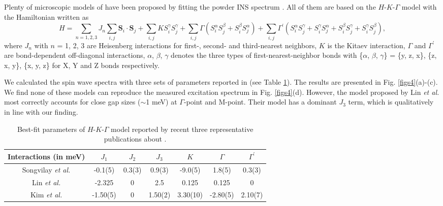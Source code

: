 \documentclass[%
reprint,
superscriptaddress,
amsmath,amssymb,
aps,
prb,
]{revtex4-2}
\begin{document}
	Plenty of microscopic models of  have been proposed by fitting the powder INS spectrum \cite{SongvilayPRB2020,LinNC2021,SamarakoonPRB2021,KimJPCM2021,SandersArxiv2021}. All of them are based on the $H$-$K$-$\Gamma$ model with the Hamiltonian written as
	\begin{equation}
		H = \sum_{n = 1,2,3}J_n\sum_{i,j}\textbf{S}_i\cdot\textbf{S}_j+\sum_{i,j}KS_i^{\gamma}S_j^{\gamma}+\sum_{i,j}\Gamma(S_i^{\alpha}S_j^{\beta}+S_i^{\beta}S_j^{\alpha})+\sum_{i,j}\Gamma^{\prime}(S_i^{\alpha}S_j^{\gamma}+S_i^{\gamma}S_j^{\alpha}+S_i^{\beta}S_j^{\gamma}+S_i^{\gamma}S_j^{\beta}),
	\end{equation}
	where $J_n$ with $n$ = 1, 2, 3 are Heisenberg interactions for first-, second- and third-nearest neighbors, $K$ is the Kitaev interaction, $\Gamma$ and $\Gamma^{\prime}$ are bond-dependent off-diagonal interactions, $\alpha$, $\beta$, $\gamma$ denotes the three types of first-nearest-neighbor bonds with \{$\alpha$, $\beta$, $\gamma$\} = \{y, z, x\}, \{z, x, y\}, \{x, y, z\} for X, Y and Z bonds respectively.
	
	We calculated the spin wave spectra with three sets of parameters reported in \cite{SongvilayPRB2020,LinNC2021,KimJPCM2021}(see Table \ref{tb1}). The results are presented in Fig. \ref{figs4}(a)-(c). We find none of these models can reproduce the measured excitation spectrum in Fig. \ref{figs4}(d). However, the model proposed by Lin \textit{et al.} most correctly accounts for close gap sizes ($\sim$1 meV) at $\Gamma$-point and M-point. Their model has a dominant $J_3$ term, which is qualitatively in line with our finding.
	
	\begin{table}[b]
		\caption{\label{tab:table1}
			Best-fit parameters of $H$-$K$-$\Gamma$ model reported by recent three representative publications about .
		}
		\begin{ruledtabular}
			\begin{tabular}{ccccccc}
				Interactions (in meV)&$J_1$&$J_2$&$J_3$&$K$&$\Gamma$&$\Gamma^\prime$\\
				\midrule
				Songvilay \textit{et al.} \cite{SongvilayPRB2020}&-0.1(5)&0.3(3)&0.9(3)&-9.0(5)&1.8(5)&0.3(3)\\Lin \textit{et al.} \cite{LinNC2021}
				&-2.325&0&2.5&0.125&0.125&0\\Kim \textit{et al.} \cite{KimJPCM2021}
				&-1.50(5)&0&1.50(2)&3.30(10)&-2.80(5)&2.10(7)\\
			\end{tabular}	
		\end{ruledtabular}
		\label{tb1}
	\end{table}
\end{document}
